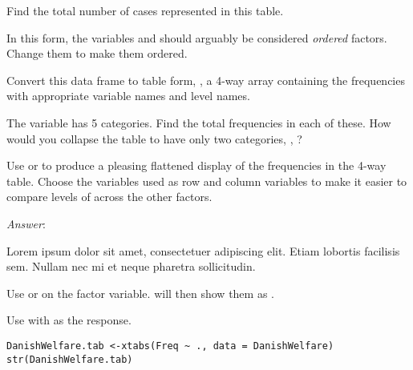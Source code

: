 \documentclass[10pt]{report}
\newcommand{\shortlipsum}{Lorem ipsum dolor sit amet, consectetuer adipiscing elit. Etiam lobortis facilisis sem. Nullam nec mi
et neque pharetra sollicitudin.}
\newcommand{\showanswers}{TRUE}  %
\newcommand{\answserstart}{\noindent\emph{Answer}:}
\newcommand{\answerfont}{\sffamily}
\newenvironment{answer}%
  {%
      \ifthenelse{\isundefined{\showanswers}}%
              {\expandafter\comment}%
              {\answserstart\answerfont}%
  }%
  {%
      \ifthenelse{\isundefined{\showanswers}}%
              {\expandafter\endcomment}%
              {}%
  }
\begin{document}
\begin{Exercises}
  \begin{enumerate*}
    \item Find the total number of cases represented in this table.
    \item In this form, the variables  and 
    should arguably be considered \emph{ordered} factors.  Change them
    to make them ordered.
    \item Convert this data frame to table form, ,
    a 4-way array containing the
    frequencies with appropriate variable names and level names.
    \item The variable  has 5 categories.  Find the total frequencies
    in each of these.  How would you collapse the table to have only
    two categories, , ?
    \item Use  or  to produce a pleasing
    flattened display of the frequencies in the 4-way table.  Choose the
    variables used as row and column variables to make it easier to compare
    levels of  across the other factors.
  \end{enumerate*}
\begin{answer}
	\begin{enumerate*}
		\item \shortlipsum
		\item Use  or  on the factor variable.   will then show them as .
		\item Use  with  as the response.
		\begin{verbatim}
DanishWelfare.tab <-xtabs(Freq ~ ., data = DanishWelfare)
str(DanishWelfare.tab)
		\end{verbatim}
	\end{enumerate*}
\end{answer}

\end{Exercises}
\end{document}

